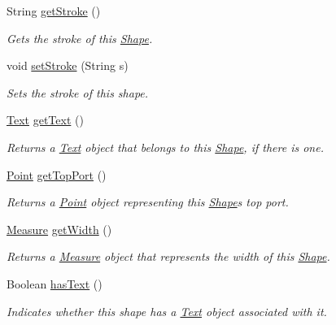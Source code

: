 \begin{DoxyCompactItemize}
String \hyperlink{classcom_1_1aarrelaakso_1_1drawl_1_1_shape_a4e1d54c7e161e3af5053939ddefdf9e6}{get\+Stroke} ()
\begin{DoxyCompactList}\small\item\em Gets the stroke of this \hyperlink{classcom_1_1aarrelaakso_1_1drawl_1_1_shape}{Shape}. \end{DoxyCompactList}\item 
void \hyperlink{classcom_1_1aarrelaakso_1_1drawl_1_1_shape_a3930f6fe72f6c5e0c0aa4c25ffbf18ff}{set\+Stroke} (String s)
\begin{DoxyCompactList}\small\item\em Sets the stroke of this shape. \end{DoxyCompactList}\item 
\hyperlink{classcom_1_1aarrelaakso_1_1drawl_1_1_text}{Text} \hyperlink{classcom_1_1aarrelaakso_1_1drawl_1_1_shape_a6f876978d4102974fedc5b41c93c7b26}{get\+Text} ()
\begin{DoxyCompactList}\small\item\em Returns a \hyperlink{classcom_1_1aarrelaakso_1_1drawl_1_1_text}{Text} object that belongs to this \hyperlink{classcom_1_1aarrelaakso_1_1drawl_1_1_shape}{Shape}, if there is one. \end{DoxyCompactList}\item 
\hyperlink{classcom_1_1aarrelaakso_1_1drawl_1_1_point}{Point} \hyperlink{classcom_1_1aarrelaakso_1_1drawl_1_1_shape_aed4e9caa294aacc973b7a531a960e9e5}{get\+Top\+Port} ()
\begin{DoxyCompactList}\small\item\em Returns a \hyperlink{classcom_1_1aarrelaakso_1_1drawl_1_1_point}{Point} object representing this \hyperlink{classcom_1_1aarrelaakso_1_1drawl_1_1_shape}{Shape}\textquotesingle{}s top port. \end{DoxyCompactList}\item 
\hyperlink{classcom_1_1aarrelaakso_1_1drawl_1_1_measure}{Measure} \hyperlink{classcom_1_1aarrelaakso_1_1drawl_1_1_shape_a3e2c58984f1bcbc2e9e86cf30868561e}{get\+Width} ()
\begin{DoxyCompactList}\small\item\em Returns a \hyperlink{classcom_1_1aarrelaakso_1_1drawl_1_1_measure}{Measure} object that represents the width of this \hyperlink{classcom_1_1aarrelaakso_1_1drawl_1_1_shape}{Shape}. \end{DoxyCompactList}\item 
Boolean \hyperlink{classcom_1_1aarrelaakso_1_1drawl_1_1_shape_a037a5515b2a6e1df1d1981aa5516e78e}{has\+Text} ()
\begin{DoxyCompactList}\small\item\em Indicates whether this shape has a \hyperlink{classcom_1_1aarrelaakso_1_1drawl_1_1_text}{Text} object associated with it. \end{DoxyCompactList}\end{DoxyCompactItemize}
